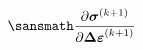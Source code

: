 \documentclass[preview]{standalone}
\begin{document}
$ \displaystyle \sansmath
  \frac{ \partial \boldsymbol{\sigma}^{(k+1)} }{ \partial \boldsymbol{\Delta \varepsilon}^{(k+1)} }
$
\end{document}
